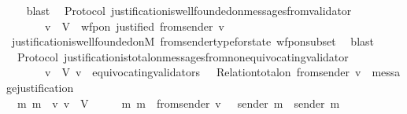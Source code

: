 \begin{isabellebody}
\ \ \isamarkupfalse%
\ blast%
\endisatagproof
{\isafoldproof}%
%
\isadelimproof
\isanewline
%
\endisadelimproof
\isanewline
{}\isamarkupfalse%
\ {\isacharparenleft}\ Protocol{\isacharparenright}\ justification{\isacharunderscore}is{\isacharunderscore}well{\isacharunderscore}founded{\isacharunderscore}on{\isacharunderscore}messages{\isacharunderscore}from{\isacharunderscore}validator{\isacharcolon}\isanewline
\ \ {\isachardoublequoteopen}{\isasymforall}\ {\isasymsigma}\ {\isasymin}\ {\isasymSigma}{\isachardot}\ {\isacharparenleft}{\isasymforall}\ v\ {\isasymin}\ V{\isachardot}\ \ wfp{\isacharunderscore}on\ justified\ {\isacharparenleft}from{\isacharunderscore}sender\ {\isacharparenleft}v{\isacharcomma}\ {\isasymsigma}{\isacharparenright}{\isacharparenright}{\isacharparenright}{\isachardoublequoteclose}\isanewline
%
\isadelimproof
\ \ %
\endisadelimproof
%
\isatagproof
{}\isamarkupfalse%
\ justification{\isacharunderscore}is{\isacharunderscore}well{\isacharunderscore}founded{\isacharunderscore}on{\isacharunderscore}M\ from{\isacharunderscore}sender{\isacharunderscore}type{\isacharunderscore}for{\isacharunderscore}state\ wfp{\isacharunderscore}on{\isacharunderscore}subset\ \isamarkupfalse%
\ blast%
\endisatagproof
{\isafoldproof}%
%
\isadelimproof
\ \isanewline
%
\endisadelimproof
\isanewline
{}\isamarkupfalse%
\ {\isacharparenleft}\ Protocol{\isacharparenright}\ justification{\isacharunderscore}is{\isacharunderscore}total{\isacharunderscore}on{\isacharunderscore}messages{\isacharunderscore}from{\isacharunderscore}non{\isacharunderscore}equivocating{\isacharunderscore}validator{\isacharcolon}\isanewline
\ \ {\isachardoublequoteopen}{\isasymforall}\ {\isasymsigma}\ {\isasymin}\ {\isasymSigma}{\isachardot}\ {\isacharparenleft}{\isasymforall}\ v\ {\isasymin}\ V{\isachardot}\ v\ {\isasymnotin}\ equivocating{\isacharunderscore}validators\ {\isasymsigma}\ {\isasymlongrightarrow}\ Relation{\isachardot}total{\isacharunderscore}on\ {\isacharparenleft}from{\isacharunderscore}sender\ {\isacharparenleft}v{\isacharcomma}\ {\isasymsigma}{\isacharparenright}{\isacharparenright}\ message{\isacharunderscore}justification{\isacharparenright}{\isachardoublequoteclose}\isanewline
%
\isadelimproof
%
\endisadelimproof
%
\isatagproof
{}\isamarkupfalse%
\ {\isacharminus}\isanewline
\ \ \isamarkupfalse%
\ {\isachardoublequoteopen}{\isasymforall}\ m{}\ m{}\ {\isasymsigma}\ v{\isachardot}\ v\ {\isasymin}\ V\ {\isasymand}\ {\isasymsigma}\ {\isasymin}\ {\isasymSigma}\ {\isasymand}\ {\isacharbraceleft}m{}{\isacharcomma}\ m{}{\isacharbraceright}\ {\isasymsubseteq}\ from{\isacharunderscore}sender\ {\isacharparenleft}v{\isacharcomma}\ {\isasymsigma}{\isacharparenright}\ {\isasymlongrightarrow}\ sender\ m{}\ {\isacharequal}\ sender\ m{}\ {\isachardoublequoteclose}\isanewline

\end{isabellebody}
